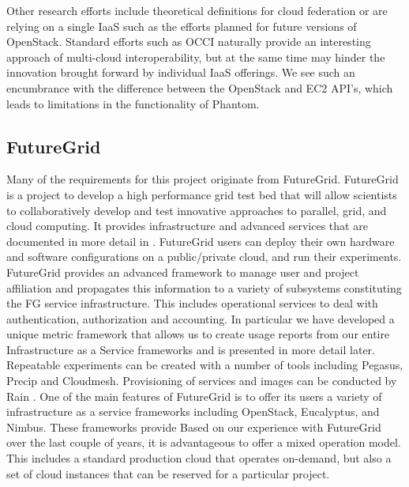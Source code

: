 \documentclass{tex/sig-alternate-2013}
\newcommand{\todo}[1]{{\color{red}{#1}}}
\begin{document}
Other research efforts include theoretical definitions for cloud federation \cite{kurze2011cloudfederation} or are relying on a single IaaS such as the efforts planned for future versions of OpenStack. Standard efforts such as OCCI naturally provide an interesting approach of multi-cloud interoperability, but at the same time may hinder the innovation brought forward by individual IaaS offerings. We see such an encumbrance with the difference between the OpenStack and EC2 API's, which leads to limitations in the functionality of Phantom.


\subsection{FutureGrid}

\todo{READ}

Many of the requirements for this project originate from
FutureGrid. FutureGrid \cite{las2010gce,las12fg-bookchapter} is a
project to develop a high performance grid test bed that will allow
scientists to collaboratively develop and test innovative approaches
to parallel, grid, and cloud computing. It provides infrastructure and
advanced services that are documented in more detail in
\cite{vonLaszewski-bigdata-bookchapter2014} . FutureGrid users can
deploy their own hardware and software configurations on a
public/private cloud, and run their experiments. FutureGrid provides
an advanced framework to manage user and project affiliation and
propagates this information to a variety of subsystems constituting
the FG service infrastructure. This includes operational services to
deal with authentication, authorization and accounting. In particular
we have developed a unique metric framework
\cite{las08federated-cloud} that allows us to create usage reports
from our entire Infrastructure as a Service frameworks and is
presented in more detail later. Repeatable experiments can be created
with a number of tools including Pegasus, Precip and
Cloudmesh. Provisioning of services and images can be conducted by
Rain \cite{imagemanagement,fg-1295}.
One of the main features of FutureGrid is to offer its users a variety
of infrastructure as a service frameworks
\cite{comparisoncloud} including OpenStack, Eucalyptus,
and Nimbus. These frameworks provide Based on our experience with
FutureGrid over the last couple of years, it is advantageous to offer
a mixed operation model. This includes a standard production cloud
that operates on-demand, but also a set of cloud instances that can be
reserved for a particular project. 
\end{document}

